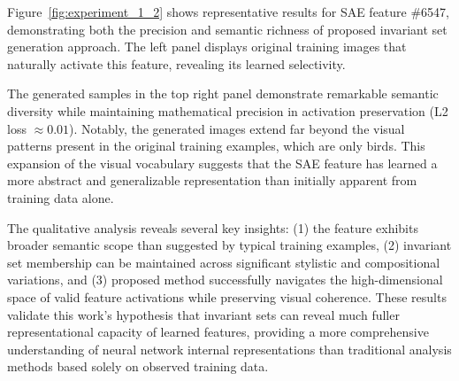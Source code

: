 Figure~\ref{fig:experiment_1_2} shows representative results for SAE feature \#6547, demonstrating both the precision and semantic richness of proposed invariant set generation approach. The left panel displays original training images that naturally activate this feature, revealing its learned selectivity.

The generated samples in the top right panel demonstrate remarkable semantic diversity while maintaining mathematical precision in activation preservation (L2 loss $\approx 0.01$). Notably, the generated images extend far beyond the visual patterns present in the original training examples, which are only birds. This expansion of the visual vocabulary suggests that the SAE feature has learned a more abstract and generalizable representation than initially apparent from training data alone.

The qualitative analysis reveals several key insights: (1) the feature exhibits broader semantic scope than suggested by typical training examples, (2) invariant set membership can be maintained across significant stylistic and compositional variations, and (3) proposed method successfully navigates the high-dimensional space of valid feature activations while preserving visual coherence. These results validate this work's hypothesis that invariant sets can reveal much fuller representational capacity of learned features, providing a more comprehensive understanding of neural network internal representations than traditional analysis methods based solely on observed training data.


